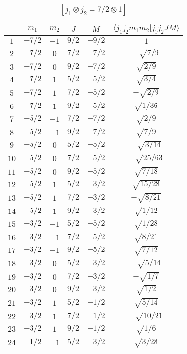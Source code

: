 \begin{table}
\tiny
\caption{$[j_1 \otimes j_2 = 7/2 \otimes 1]$}
\begin{center}
\begin{tabular}{|c|c|c|c|c|c|}
\hline 
   & $m_1$ & $m_2$ & $J$ & $M$ & $\langle j_1 j_2 m_1 m_2 | j_1 j_2 J M \rangle$ \\ 
\hline 
$1$ & $-7/2$ & $-1$ & $9/2$ & $-9/2$ & $1$ \\ 
$2$ & $-7/2$ & $0$ & $7/2$ & $-7/2$ & $-\sqrt{7/9}$ \\ 
$3$ & $-7/2$ & $0$ & $9/2$ & $-7/2$ & $\sqrt{2/9}$ \\ 
$4$ & $-7/2$ & $1$ & $5/2$ & $-5/2$ & $\sqrt{3/4}$ \\ 
$5$ & $-7/2$ & $1$ & $7/2$ & $-5/2$ & $-\sqrt{2/9}$ \\ 
$6$ & $-7/2$ & $1$ & $9/2$ & $-5/2$ & $\sqrt{1/36}$ \\ 
$7$ & $-5/2$ & $-1$ & $7/2$ & $-7/2$ & $\sqrt{2/9}$ \\ 
$8$ & $-5/2$ & $-1$ & $9/2$ & $-7/2$ & $\sqrt{7/9}$ \\ 
$9$ & $-5/2$ & $0$ & $5/2$ & $-5/2$ & $-\sqrt{3/14}$ \\ 
$10$ & $-5/2$ & $0$ & $7/2$ & $-5/2$ & $-\sqrt{25/63}$ \\ 
$11$ & $-5/2$ & $0$ & $9/2$ & $-5/2$ & $\sqrt{7/18}$ \\ 
$12$ & $-5/2$ & $1$ & $5/2$ & $-3/2$ & $\sqrt{15/28}$ \\ 
$13$ & $-5/2$ & $1$ & $7/2$ & $-3/2$ & $-\sqrt{8/21}$ \\ 
$14$ & $-5/2$ & $1$ & $9/2$ & $-3/2$ & $\sqrt{1/12}$ \\ 
$15$ & $-3/2$ & $-1$ & $5/2$ & $-5/2$ & $\sqrt{1/28}$ \\ 
$16$ & $-3/2$ & $-1$ & $7/2$ & $-5/2$ & $\sqrt{8/21}$ \\ 
$17$ & $-3/2$ & $-1$ & $9/2$ & $-5/2$ & $\sqrt{7/12}$ \\ 
$18$ & $-3/2$ & $0$ & $5/2$ & $-3/2$ & $-\sqrt{5/14}$ \\ 
$19$ & $-3/2$ & $0$ & $7/2$ & $-3/2$ & $-\sqrt{1/7}$ \\ 
$20$ & $-3/2$ & $0$ & $9/2$ & $-3/2$ & $\sqrt{1/2}$ \\ 
$21$ & $-3/2$ & $1$ & $5/2$ & $-1/2$ & $\sqrt{5/14}$ \\ 
$22$ & $-3/2$ & $1$ & $7/2$ & $-1/2$ & $-\sqrt{10/21}$ \\ 
$23$ & $-3/2$ & $1$ & $9/2$ & $-1/2$ & $\sqrt{1/6}$ \\ 
$24$ & $-1/2$ & $-1$ & $5/2$ & $-3/2$ & $\sqrt{3/28}$ \\ 

\end{tabular}
\end{center}
\end{table}
